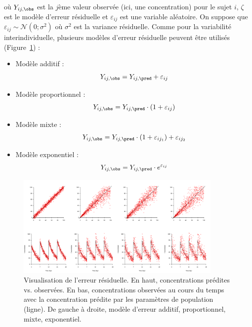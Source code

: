 où $Y_{ij,\obs}$ est la $j$ème valeur observée (ici, une concentration) pour le sujet $i$, $\zeta$ est le modèle d'erreur résiduelle et $\varepsilon_{ij}$ est une variable aléatoire. On suppose que $\varepsilon_{ij} \sim \mathcal{N}(0 ; \sigma^2)$ où $\sigma^2$ est la variance résiduelle. Comme pour la variabilité interindividuelle, plusieurs modèles d'erreur résiduelle peuvent être utilisés (Figure~\ref{fig:10}) :
\begin{itemize}
\item Modèle additif :
\begin{equation}
Y_{ij,\obs} = Y_{ij,\pred} + \varepsilon_{ij}
\label{eq:50}
\end{equation}

\item Modèle proportionnel :
\begin{equation}
Y_{ij,\obs} = Y_{ij,\pred} \cdot \left(1 + \varepsilon_{ij} \right)
\label{eq:51}
\end{equation}

\item Modèle mixte :
\begin{equation}
Y_{ij,\obs} = Y_{ij,\pred} \cdot \left(1 + \varepsilon_{ij_1} \right) +  \varepsilon_{ij_2}
\label{eq:52}
\end{equation}

\item Modèle exponentiel :
\begin{equation}
Y_{ij,\obs} = Y_{ij,\pred} \cdot e^{\varepsilon_{ij}}
\label{eq:53}
\end{equation}

\end{itemize}

\begin{figure}[htbp]
	\centering
		\includegraphics[width=10cm]{figures/raster/FIG_10}
	\caption[Visualisation de l'erreur résiduelle.]{Visualisation de l'erreur résiduelle. En haut, concentrations prédites vs. observées. En bas, concentrations observées au cours du temps avec la concentration prédite par les paramètres de population (ligne). De gauche à droite, modèle d'erreur additif, proportionnel, mixte, exponentiel.}
	\label{fig:10}
\end{figure}

